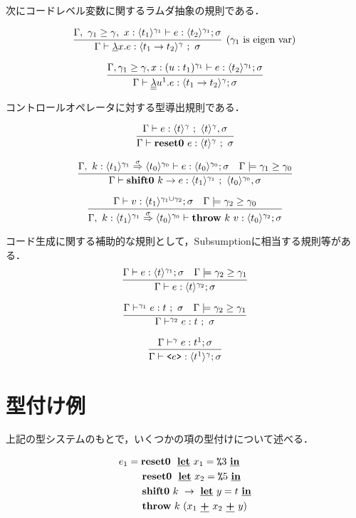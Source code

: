 次にコードレベル変数に関するラムダ抽象の規則である．

\[
  \infer[(\gamma_1~\text{is eigen var})]
  {\Gamma \vdash \cfun{x}{e} : \codeT{t_1\to t_2}{\gamma} ~;~ \sigma}
  {\Gamma,~\gamma_1 \ord \gamma,~x:\codeT{t_1}{\gamma_1} \vdash e
    : \codeT{t_2}{\gamma_1}; \sigma}
\]

\[
  \infer
  {\Gamma \vdash \ccfun{u^1}{e} : \codeT{t_1 \to t_2}{\gamma} ; \sigma}
  {\Gamma, \gamma_1 \ord \gamma, x : (u : t_1)^{\gamma_1} \vdash e : \codeT{t_2}{\gamma_1} ; \sigma}
\]

コントロールオペレータに対する型導出規則である．

\[
  \infer{\Gamma \vdash \resetz{e} : \codeT{t}{\gamma} ~;~ \sigma}
  {\Gamma \vdash e : \codeT{t}{\gamma} ~;~ \codeT{t}{\gamma}, \sigma}
\]

\[
  \infer{\Gamma \vdash \shiftz{k}{e} : \codeT{t_1}{\gamma_1} ~;~ \codeT{t_0}{\gamma_0},\sigma}
  {\Gamma,~k:\contT{\codeT{t_1}{\gamma_1}}{\codeT{t_0}{\gamma_0}}{\sigma}
    \vdash e : \codeT{t_0}{\gamma_0} ; \sigma
    & \Gamma \models \gamma_1 \ord \gamma_0
  }
\]

\[
  \infer
  {\Gamma,~k:\contT{\codeT{t_1}{\gamma_1}}{\codeT{t_0}{\gamma_0}}{\sigma}
    \vdash \throw{k}{v} : \codeT{t_0}{\gamma_2} ; \sigma}
  {\Gamma
    \vdash v : \codeT{t_1}{\gamma_1 \cup \gamma_2} ; \sigma
    & \Gamma \models \gamma_2 \ord \gamma_0
  }
\]

コード生成に関する補助的な規則として，Subsumptionに相当する規則等がある．
\[
  \infer
  {\Gamma \vdash e : \codeT{t}{\gamma_2} ; \sigma}
  {\Gamma \vdash e : \codeT{t}{\gamma_1} ; \sigma
    & \Gamma \models \gamma_2 \ord \gamma_1
  }
\]

\[
  \infer
  {\Gamma \vdash^{\gamma_2} e : t ~;~ \sigma}
  {\Gamma \vdash^{\gamma_1} e : t ~;~ \sigma
    & \Gamma \models \gamma_2 \ord \gamma_1
  }
\]


\[
  \infer
  {\Gamma \vdash \code{e} : \codeT{t^1}{\gamma} ; \sigma}
  {\Gamma \vdash^{\gamma} e : t^1 ; \sigma}
\]


\section{型付け例}

上記の型システムのもとで，いくつかの項の型付けについて述べる．

\begin{align*}
  e_1 & = \textbf{reset0} ~~\underline{\textbf{let}}~x_1=\texttt{\%}{3}~\underline{\textbf{in}} \\
      & \phantom{=}~~ \textbf{reset0} ~~\underline{\textbf{let}}~x_2=\texttt{\%}{5}~\underline{\textbf{in}} \\
      & \phantom{=}~~ \textbf{shift0}~k~\to~\underline{\textbf{let}}~y=t~\underline{\textbf{in}} \\
      & \phantom{=}~~ \textbf{throw}~k~(x_1~\underline{\textbf{+}}~x_2~\underline{\textbf{+}}~y)
\end{align*}

